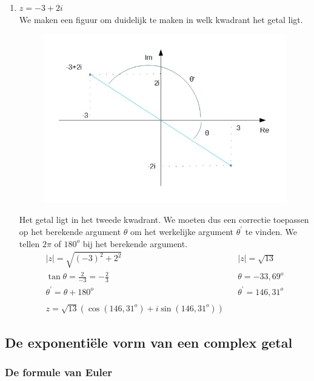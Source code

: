 \begin{enumerate}
	\item $z=-3+2i$ \\ We maken een figuur om duidelijk te maken in welk kwadrant het getal ligt. \\
	\begin{figure}[h]
		\begin{center}
			\includegraphics[scale=0.5]{3_gonio_complexe_getallen/inputs/complex-getal-voorbeeld3.jpg}
		\end{center}
	\end{figure}
	
	Het getal ligt in het tweede kwadrant. We moeten dus een correctie toepassen op het berekende argument $\theta$ om het werkelijke argument $\theta^{'}$ te vinden. We tellen  $2\pi$ of $180^{o}$ bij het berekende argument. \\
	\[ \begin{array}{lll}
	|z|=\sqrt{(-3)^2 +2^2} & & |z|=\sqrt{13} \\
	\tan \theta = \frac{2}{-3}=-\frac{2}{3} & & \theta = -33,69^{o}\\
	\theta^{'}=\theta+180^{o} & & \theta^{'}=146,31^{o} \\
	&  &          \\
	z=\sqrt{13} (\cos (146,31^{o}) + i \sin (146,31^{o})) &  & 
	\end{array} \]
\end{enumerate}

\subsection{De exponenti\"{e}le vorm van een complex getal}

\subsubsection{De formule van Euler}

